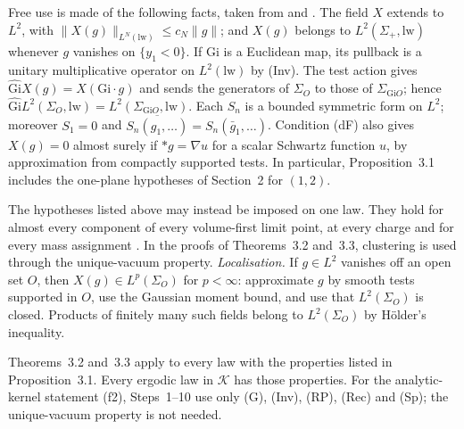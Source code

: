 \documentclass[11pt,letterpaper,reqno]{amsart}
\theoremstyle{definition}
\begin{document}
Free use is made of the following facts, taken from \cite[Proposition~5.1]{QEDConstruction} and \cite[Sections~5.2 and~7.4]{QEDConstruction}.
The field $X$ extends to $L^2$, with $\|X(g)\|_{L^N(\mathrm{lw})}\le c_N\|g\|$; and $X(g)$ belongs to $L^2(\Sigma_+,\mathrm{lw})$ whenever $g$ vanishes on $\{y_1<0\}$.
If $\mathrm{Gi}$ is a Euclidean map, its pullback is a unitary multiplicative operator on $L^2(\mathrm{lw})$ by (Inv). The test action gives $\widehat{\mathrm{Gi}}X(g)=X(\mathrm{Gi}\cdot g)$ and sends the generators of $\Sigma_O$ to those of $\Sigma_{\mathrm{Gi}O}$; hence $\widehat{\mathrm{Gi}}L^2(\Sigma_O,\mathrm{lw})=L^2(\Sigma_{\mathrm{Gi}O},\mathrm{lw})$.
Each $S_n$ is a bounded symmetric form on $L^2$; moreover $S_1=0$ and $\overline{S_n(g_1,\dots)}=S_n(\bar g_1,\dots)$.
Condition (dF) also gives $X(g)=0$ almost surely if $\ast g=\nabla u$ for a scalar Schwartz function $u$, by approximation from compactly supported tests.
In particular, Proposition~3.1 includes the one-plane hypotheses of Section~2 for $(1,2)$.


The hypotheses listed above may instead be imposed on one law.
They hold for almost every component of every volume-first limit
point, at every charge and for every mass assignment
\cite[Section~6, Section~7.5, and Theorem~8.6]{QEDConstruction}. In the proofs of Theorems~3.2
and~3.3, clustering is used through the unique-vacuum property.
\emph{Localisation.} If $g\in L^2$ vanishes off an open set $O$,
then $X(g)\in L^p(\Sigma_O)$ for $p<\infty$: approximate $g$ by smooth
tests supported in $O$, use the Gaussian moment bound, and use that
$L^2(\Sigma_O)$ is closed. Products of finitely many such fields
belong to $L^2(\Sigma_O)$ by H\"older's inequality.

Theorems~3.2 and~3.3 apply to every law with the properties listed in
Proposition~3.1. Every ergodic law in $\mathcal K$ has those properties.
For the analytic-kernel statement (f2), Steps~1--10 use only (G),
(Inv), (RP), (Rec) and (Sp); the unique-vacuum property is not needed.
\end{document}
